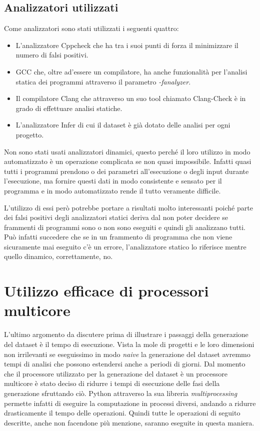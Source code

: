\subsection{Analizzatori utilizzati}
Come analizzatori sono stati utilizzati i seguenti quattro:
    \begin{itemize}
        \item L'analizzatore Cppcheck che ha tra i suoi punti di forza il minimizzare il numero di falsi positivi.
        \item GCC che, oltre ad'essere un compilatore, ha anche funzionalità per l'analisi statica dei programmi attraverso il parametro \textit{-fanalyzer}.
        \item Il compilatore Clang che attraverso un suo tool chiamato Clang-Check è in grado di effettuare analisi statiche.
        \item L'analizzatore Infer di cui il dataset è già dotato delle analisi per ogni progetto.
    \end{itemize}
Non sono stati usati analizzatori dinamici, questo perché il loro utilizzo in modo automatizzato è un operazione complicata se non quasi impossibile. 
Infatti quasi tutti i programmi prendono o dei parametri all'esecuzione o degli input durante l'esecuzione, ma fornire questi dati in modo consistente e sensato per il programma e in modo automatizzato rende il tutto veramente difficile.

L'utilizzo di essi però potrebbe portare a risultati molto interessanti poiché parte dei falsi positivi degli analizzatori statici deriva dal non poter decidere se frammenti di programmi sono o non sono eseguiti e quindi gli analizzano tutti.
Può infatti succedere che se in un frammento di programma che non viene sicuramente mai eseguito c'è un errore, l'analizzatore statico lo riferisce mentre quello dinamico, correttamente, no.


\section{Utilizzo efficace di processori multicore}
L'ultimo argomento da discutere prima di illustrare i passaggi della generazione del dataset è il tempo di esecuzione. 
Vista la mole di progetti e le loro dimensioni non irrilevanti se eseguissimo in modo \textit{naive} la generazione del dataset avremmo tempi di analisi che possono estendersi anche a periodi di giorni.
Dal momento che il processore utilizzato per la generazione del dataset è un processore multicore è stato deciso di ridurre i tempi di esecuzione delle fasi della generazione sfruttando ciò.
Python attraverso la sua libreria \textit{multiprocessing} permette infatti di eseguire la computazione in processi diversi, andando a ridurre drasticamente il tempo delle operazioni.
Quindi tutte le operazioni di seguito descritte, anche non facendone più menzione, saranno eseguite in questa maniera.

